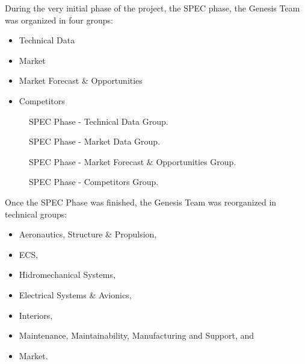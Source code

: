 During the very initial phase of the project, the SPEC phase, the Genesis Team was organized in four groups:

\begin{itemize}
  \item Technical Data
  \item Market
  \item Market Forecast \& Opportunities
  \item Competitors
\end{itemize}

\begin{figure}[H] %
\caption{SPEC Phase  - Technical Data Group.}
\label{fig:TechnicalDataGroup}
\end{figure}

\begin{figure}[H] %
\caption{SPEC Phase  - Market Data Group.}
\label{fig:MarketDataGroup}
\end{figure}

\begin{figure}[H] %
\caption{SPEC Phase  - Market Forecast \& Opportunities Group.}
\label{fig:SpecForecastMembers}
\end{figure}

\begin{figure}[H] %
\caption{SPEC Phase  - Competitors Group.}
\label{fig:CompetitorsGroup}
\end{figure}

Once the SPEC Phase was finished, the Genesis Team was reorganized in technical groups:

\begin{itemize}
  \item Aeronautics, Structure \& Propulsion,
  \item ECS,
  \item Hidromechanical Systems,
  \item Electrical Systems \& Avionics,
  \item Interiors,
  \item Maintenance, Maintainability, Manufacturing and Support, and
  \item Market.
\end{itemize}

